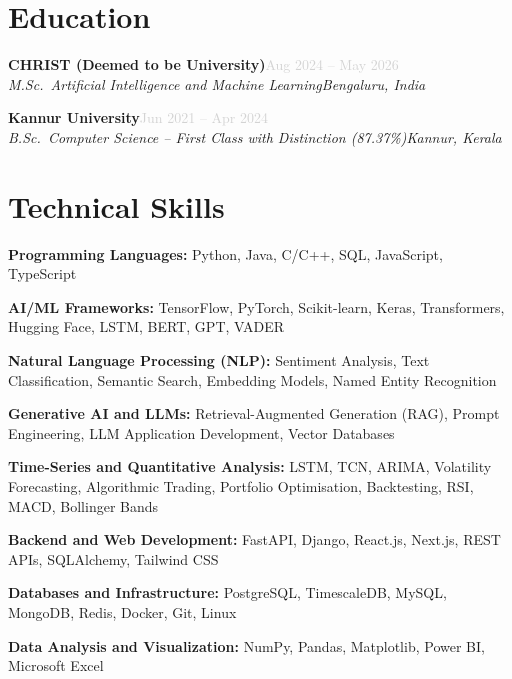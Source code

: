 \documentclass[a4paper,10.5pt]{article}
\newcommand{\resumeEntry}[4]{%
  \vspace{3pt}%
  \noindent\textbf{\normalsize #1}\hfill\textcolor{lightgray}{\small #2}\\%
  \noindent\textit{\small #3}\hfill\textit{\small #4}%
  \vspace{2pt}%
}
\begin{document}
\section{Education}

\resumeEntry
  {CHRIST (Deemed to be University)}{Aug 2024 -- May 2026}
  {M.Sc.\ Artificial Intelligence and Machine Learning}{Bengaluru, India}

\vspace{6pt}

\resumeEntry
  {Kannur University}{Jun 2021 -- Apr 2024}
  {B.Sc.\ Computer Science -- First Class with Distinction (87.37\%)}{Kannur, Kerala}


\section{Technical Skills}

\small{
\noindent\textbf{Programming Languages:} Python, Java, C/C++, SQL, JavaScript, TypeScript

\vspace{4pt}
\noindent\textbf{AI/ML Frameworks:} TensorFlow, PyTorch, Scikit-learn, Keras, Transformers, Hugging Face, LSTM, BERT, GPT, VADER

\vspace{4pt}
\noindent\textbf{Natural Language Processing (NLP):} Sentiment Analysis, Text Classification, Semantic Search, Embedding Models, Named Entity Recognition

\vspace{4pt}
\noindent\textbf{Generative AI and LLMs:} Retrieval-Augmented Generation (RAG), Prompt Engineering, LLM Application Development, Vector Databases

\vspace{4pt}
\noindent\textbf{Time-Series and Quantitative Analysis:} LSTM, TCN, ARIMA, Volatility Forecasting, Algorithmic Trading, Portfolio Optimisation, Backtesting, RSI, MACD, Bollinger Bands

\vspace{4pt}
\noindent\textbf{Backend and Web Development:} FastAPI, Django, React.js, Next.js, REST APIs, SQLAlchemy, Tailwind CSS

\vspace{4pt}
\noindent\textbf{Databases and Infrastructure:} PostgreSQL, TimescaleDB, MySQL, MongoDB, Redis, Docker, Git, Linux

\vspace{4pt}
\noindent\textbf{Data Analysis and Visualization:} NumPy, Pandas, Matplotlib, Power BI, Microsoft Excel
}
\end{document}
